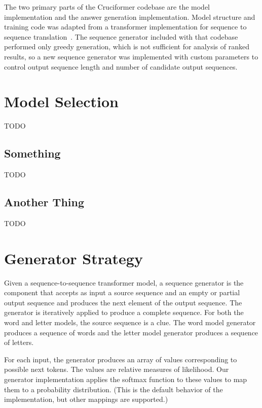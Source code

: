 \documentclass[letterpaper]{article} %
\begin{document}
\begin{NoHyper}
The two primary parts of the Cruciformer codebase are the model implementation and the answer generation implementation. Model structure and training code was adapted from a transformer implementation for sequence to sequence translation~\cite{chegde2022}. The sequence generator included with that codebase performed only greedy generation, which is not sufficient for analysis of ranked results, so a new sequence generator was implemented with custom parameters to control output sequence length and number of candidate output sequences.

\section{Model Selection}
\label{sec:model}

TODO

\subsection{Something}
\label{subsec:something}

TODO

\subsection{Another Thing}
\label{subsec:another}

TODO

\section{Generator Strategy}
\label{sec:generator}

Given a sequence-to-sequence transformer model, a sequence generator is the component that accepts as input a source sequence and an empty or partial output sequence and produces the next element of the output sequence. The generator is iteratively applied to produce a complete sequence. For both the word and letter models, the source sequence is a clue. The word model generator produces a sequence of words and the letter model generator produces a sequence of letters.

For each input, the generator produces an array of values corresponding to possible next tokens. The values are relative measures of likelihood. Our generator implementation applies the softmax function to these values to map them to a probability distribution. (This is the default behavior of the implementation, but other mappings are supported.)


\end{NoHyper}
\end{document}
